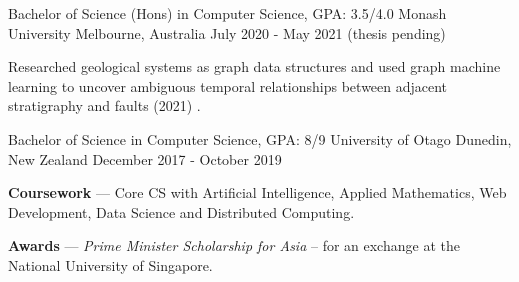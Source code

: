 
\begin{cventries}
  \cventry
    {Bachelor of Science (Hons) in Computer Science, GPA: 3.5/4.0} %
    {Monash University} %
    {Melbourne, Australia} %
    {July 2020 - May 2021 (thesis pending)} %
    {
      \begin{cvitems} %
         \item {Researched geological systems as graph data structures and used graph machine learning to uncover ambiguous temporal relationships between adjacent stratigraphy and faults (2021) .}
      \end{cvitems}
    }

  \cventry
    {Bachelor of Science in Computer Science, GPA: 8/9} %
    {University of Otago} %
    {Dunedin, New Zealand} %
    {December 2017 - October 2019} %
    {
      \begin{cvitems} %
         \item {\textbf{Coursework} --- Core CS with Artificial Intelligence, Applied Mathematics, Web Development, Data Science and Distributed Computing.}
         \item {\textbf{Awards} --- \emph{Prime Minister Scholarship for Asia} -- for an exchange at the National University of Singapore. }
      \end{cvitems}
    }
\end{cventries}
